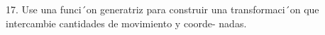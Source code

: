 17. Use una funci´on generatriz para construir una transformaci´on que intercambie cantidades de movimiento y coorde-
nadas.